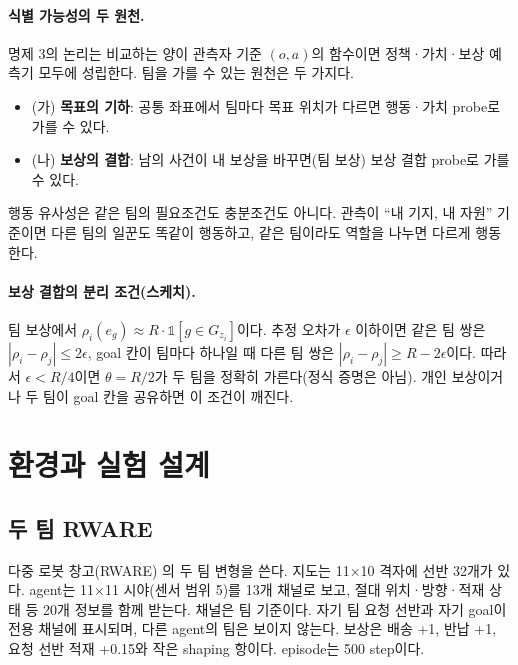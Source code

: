 \documentclass[10pt]{article}
\begin{document}
\paragraph{식별 가능성의 두 원천.}
명제 3의 논리는 비교하는 양이 관측자 기준 $(o,a)$의 함수이면 정책·가치·보상 예측기 모두에 성립한다. 팀을 가를 수 있는 원천은 두 가지다.
\begin{itemize}
  \item (가) \textbf{목표의 기하}: 공통 좌표에서 팀마다 목표 위치가 다르면 행동·가치 probe로 가를 수 있다.
  \item (나) \textbf{보상의 결합}: 남의 사건이 내 보상을 바꾸면(팀 보상) 보상 결합 probe로 가를 수 있다.
\end{itemize}
행동 유사성은 같은 팀의 필요조건도 충분조건도 아니다. 관측이 ``내 기지, 내 자원'' 기준이면 다른 팀의 일꾼도 똑같이 행동하고, 같은 팀이라도 역할을 나누면 다르게 행동한다.

\paragraph{보상 결합의 분리 조건(스케치).}
팀 보상에서 $\rho_i(e_g) \approx R \cdot \mathbb{1}[g \in G_{z_i}]$이다. 추정 오차가 $\epsilon$ 이하이면 같은 팀 쌍은 $|\rho_i - \rho_j| \le 2\epsilon$, goal 칸이 팀마다 하나일 때 다른 팀 쌍은 $|\rho_i - \rho_j| \ge R - 2\epsilon$이다. 따라서 $\epsilon < R/4$이면 $\theta = R/2$가 두 팀을 정확히 가른다(정식 증명은 아님).
개인 보상이거나 두 팀이 goal 칸을 공유하면 이 조건이 깨진다.

\section{환경과 실험 설계}

\subsection{두 팀 RWARE}
다중 로봇 창고(RWARE) \cite{papoudakis2021}의 두 팀 변형을 쓴다. 지도는 11$\times$10 격자에 선반 32개가 있다.
agent는 11$\times$11 시야(센서 범위 5)를 13개 채널로 보고, 절대 위치·방향·적재 상태 등 20개 정보를 함께 받는다.
채널은 팀 기준이다. 자기 팀 요청 선반과 자기 goal이 전용 채널에 표시되며, 다른 agent의 팀은 보이지 않는다.
보상은 배송 +1, 반납 +1, 요청 선반 적재 +0.15와 작은 shaping 항이다. episode는 500 step이다.
\end{document}
